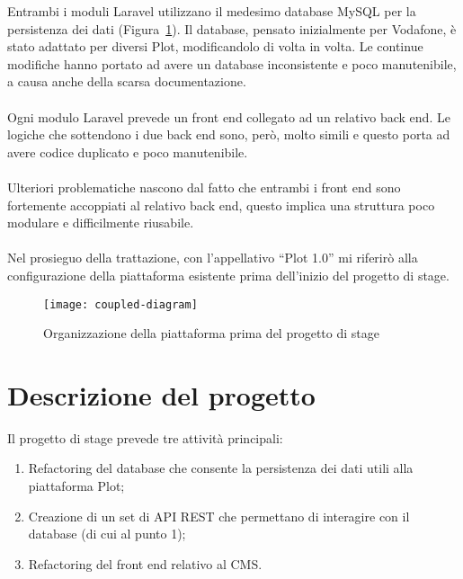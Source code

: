 Entrambi i moduli Laravel utilizzano il medesimo database MySQL per la persistenza dei dati (Figura~\ref{fig:coupled}). 
Il database, pensato inizialmente per Vodafone, è stato adattato per diversi Plot, modificandolo di volta in volta. Le continue modifiche hanno portato ad avere un database inconsistente e poco manutenibile, a causa anche della scarsa documentazione.
\\ \\
Ogni modulo Laravel prevede un front end collegato ad un relativo back end. Le logiche che sottendono i due back end sono, però, molto simili e questo porta ad avere codice duplicato e poco manutenibile.
\\ \\
Ulteriori problematiche nascono dal fatto che entrambi i front end sono fortemente accoppiati al relativo back end, questo implica una struttura poco modulare e difficilmente riusabile.
\\ \\
Nel prosieguo della trattazione, con l’appellativo “Plot 1.0” mi riferirò alla configurazione della piattaforma esistente prima dell'inizio del progetto di stage.

\begin{figure}[htbp]
\begin{center}
\texttt{[image: coupled-diagram]}
\caption{Organizzazione della piattaforma prima del progetto di stage}
\label{fig:coupled}
\end{center}
\end{figure}

\section{Descrizione del progetto}
Il progetto di stage prevede tre attività principali:
\begin{enumerate}
	\item Refactoring del database che consente la persistenza dei dati utili alla piattaforma Plot;
	\item Creazione di un set di API REST che permettano di interagire con il database (di cui al punto 1);
	\item Refactoring del front end relativo al CMS.
\end{enumerate}

